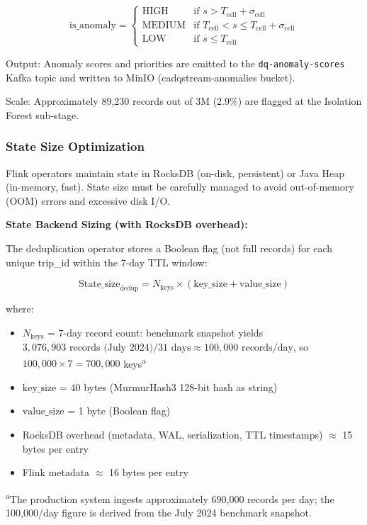 \begin{equation}
\text{is\_anomaly} = \begin{cases}
\text{HIGH} & \text{if } s > T_{\text{cell}} + \sigma_{\text{cell}} \\
\text{MEDIUM} & \text{if } T_{\text{cell}} < s \leq T_{\text{cell}} + \sigma_{\text{cell}} \\
\text{LOW} & \text{if } s \leq T_{\text{cell}}
\end{cases}
\end{equation}

Output: Anomaly scores and priorities are emitted to the \texttt{dq-anomaly-scores} Kafka topic and written to MinIO (cadqstream-anomalies bucket).

Scale: Approximately 89,230 records out of 3M (2.9\%) are flagged at the Isolation Forest sub-stage.

\subsubsection{State Size Optimization}

Flink operators maintain state in RocksDB (on-disk, persistent) or Java Heap (in-memory, fast). State size must be carefully managed to avoid out-of-memory (OOM) errors and excessive disk I/O.

\textbf{State Backend Sizing (with RocksDB overhead):}

The deduplication operator stores a Boolean flag (not full records) for each unique trip\_id within the 7-day TTL window:

\begin{equation}
\text{State\_size}_{\text{dedup}} = N_{\text{keys}} \times (\text{key\_size} + \text{value\_size})
\end{equation}

where:
\begin{itemize}
    \item $N_{\text{keys}}$ = 7-day record count: benchmark snapshot yields $3{,}076{,}903 \text{ records (July 2024)} / 31 \text{ days} \approx 100{,}000 \text{ records/day}$, so $100{,}000 \times 7 = 700{,}000$ keys\textsuperscript{a}
    \item $\text{key\_size}$ = 40 bytes (MurmurHash3 128-bit hash as string)
    \item $\text{value\_size}$ = 1 byte (Boolean flag)
    \item RocksDB overhead (metadata, WAL, serialization, TTL timestamps) $\approx$ 15 bytes per entry
    \item Flink metadata $\approx$ 16 bytes per entry
\end{itemize}
\addtocounter{footnote}{1}\textsuperscript{a}The production system ingests approximately 690,000 records per day; the 100,000/day figure is derived from the July 2024 benchmark snapshot.

